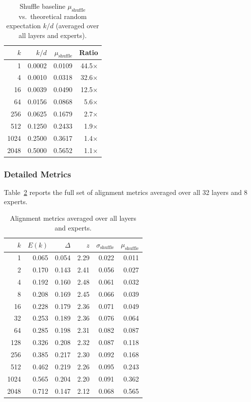 \begin{table}[h]
\centering
\caption{Shuffle baseline $\mu_{\text{shuffle}}$ vs.\ theoretical random expectation $k/d$ (averaged over all layers and experts).}
\label{tab:shuffle_baseline}
\small
\begin{tabular}{r r r r}
\toprule
$k$ & $k/d$ & $\mu_{\text{shuffle}}$ & Ratio \\
\midrule
1    & 0.0002 & 0.0109 & 44.5$\times$ \\
4    & 0.0010 & 0.0318 & 32.6$\times$ \\
16   & 0.0039 & 0.0490 & 12.5$\times$ \\
64   & 0.0156 & 0.0868 &  5.6$\times$ \\
256  & 0.0625 & 0.1679 &  2.7$\times$ \\
512  & 0.1250 & 0.2433 &  1.9$\times$ \\
1024 & 0.2500 & 0.3617 &  1.4$\times$ \\
2048 & 0.5000 & 0.5652 &  1.1$\times$ \\
\bottomrule
\end{tabular}
\end{table}

\subsubsection{Detailed Metrics}

Table~\ref{tab:alignment_metrics} reports the full set of alignment metrics averaged over all 32 layers and 8 experts.

\begin{table}[h]
\centering
\caption{Alignment metrics averaged over all layers and experts.}
\label{tab:alignment_metrics}
\small
\begin{tabular}{r r r r r r}
\toprule
$k$ & $E(k)$ & $\Delta$ & $z$ & $\sigma_{\text{shuffle}}$ & $\mu_{\text{shuffle}}$ \\
\midrule
1    & 0.065 & 0.054 & 2.29 & 0.022 & 0.011 \\
2    & 0.170 & 0.143 & 2.41 & 0.056 & 0.027 \\
4    & 0.192 & 0.160 & 2.48 & 0.061 & 0.032 \\
8    & 0.208 & 0.169 & 2.45 & 0.066 & 0.039 \\
16   & 0.228 & 0.179 & 2.36 & 0.071 & 0.049 \\
32   & 0.253 & 0.189 & 2.36 & 0.076 & 0.064 \\
64   & 0.285 & 0.198 & 2.31 & 0.082 & 0.087 \\
128  & 0.326 & 0.208 & 2.32 & 0.087 & 0.118 \\
256  & 0.385 & 0.217 & 2.30 & 0.092 & 0.168 \\
512  & 0.462 & 0.219 & 2.26 & 0.095 & 0.243 \\
1024 & 0.565 & 0.204 & 2.20 & 0.091 & 0.362 \\
2048 & 0.712 & 0.147 & 2.12 & 0.068 & 0.565 \\
\bottomrule
\end{tabular}
\end{table}

